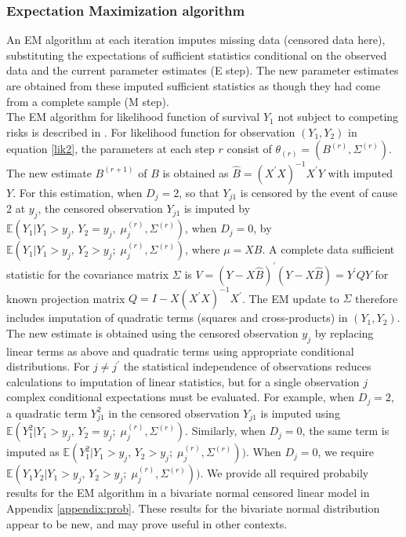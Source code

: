 \documentclass[twoside,a4paper,12pt]{article}
\newcommand{\EE}{\mathbb{E}}
\renewcommand{\hat}{\widehat}
\newcommand{\XtX}{(X^\prime X)}
\theoremstyle{plain}
\theoremstyle{definition}
\begin{document}
\subsubsection{Expectation Maximization algorithm}

An EM algorithm {at each iteration imputes} missing data (censored data here), 
{substituting} the expectations {of sufficient statistics} conditional on the observed data and the 
current parameter estimates (E step). 
The new parameter estimates are obtained from {these imputed} sufficient statistics as 
though they had come from a complete sample (M step). 
\\


The EM algorithm for likelihood function of survival $Y_1$ %
not subject to competing risks is described in \cite{Lunn1998}. 
For likelihood function for observation $(Y_1,Y_2)$ in equation \eqref{lik2}, 
the parameters at each step $r$ consist of 
$\theta_{(r)}= \left( B^{(r)}, \Sigma^{(r)} \right)$. %
The new estimate $B^{(r+1)}$ of $B$ %
is obtained as $\hat{B}=\XtX^{-1}X^\prime Y$ with imputed $Y$.
For this estimation, when $D_j=2$, so that $Y_{j1}$ is censored by the event of cause 2 at $y_j$,  
the censored observation $Y_{j1}$ is imputed by 
$\EE(Y_1|Y_1>y_j,\,Y_2=y_j,\;\mu_j^{(r)},\Sigma^{(r)})$, 
when $D_j=0$,  by 
$\EE(Y_1|{Y_1>y_j,}\,{Y_2>y_j;}\; \mu_j^{(r)},\Sigma^{(r)})$, where $\mu=XB$. 
A complete data sufficient statistic for the covariance matrix $\Sigma$
is $V= (Y-X\hat{B})^{'} (Y-X\hat{B})=Y^\prime Q Y$ for known projection matrix $Q=I-X \XtX^{-1} X^\prime$.
The EM update to $\Sigma$ therefore includes imputation of quadratic terms (squares and cross-products) in $(Y_1,Y_2)$.
The new estimate %
is obtained using the censored observation $y_j$ 
by replacing linear terms as above and 
quadratic terms using appropriate conditional distributions.
For $j \neq j^\prime$ the statistical independence of observations reduces calculations to imputation of linear statistics,
but for a single observation $j$ complex conditional expectations must be evaluated.
For example, when 
$D_j=2$,  a quadratic term $Y_{j1}^2$ in the censored observation $Y_{j1}$ 
is imputed using $\EE(Y_1^2|{Y_1>y_j,}\,{Y_2=y_j}; \; \mu_j^{(r)},\Sigma^{(r)} )$.
Similarly, when $D_j=0$,  the same term is imputed as 
$\EE(Y_1^2|{Y_1>y_j,}\,{Y_2>y_j;} \; \mu_j^{(r)},\Sigma^{(r)}))$. 
When 
$D_j=0$,  we require $\EE(Y_1 Y_2|{Y_1>y_j,}\,{Y_2>y_j;} \; \mu_j^{(r)},\Sigma^{(r)}))$. 
We provide all required probabily results for the EM algorithm in a bivariate normal censored linear model in Appendix \ref{appendix:prob}.
These results for the bivariate normal distribution appear to be new, and may prove useful in other contexts. 
\end{document}
